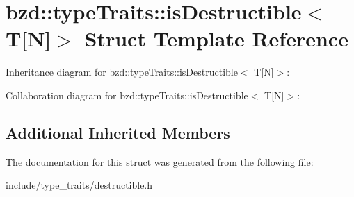 \hypertarget{structbzd_1_1typeTraits_1_1isDestructible_3_01T[N]_4}{}\section{bzd\+:\+:type\+Traits\+:\+:is\+Destructible$<$ T\mbox{[}N\mbox{]}$>$ Struct Template Reference}
\label{structbzd_1_1typeTraits_1_1isDestructible_3_01T[N]_4}


Inheritance diagram for bzd\+:\+:type\+Traits\+:\+:is\+Destructible$<$ T\mbox{[}N\mbox{]}$>$\+:


Collaboration diagram for bzd\+:\+:type\+Traits\+:\+:is\+Destructible$<$ T\mbox{[}N\mbox{]}$>$\+:
\subsection*{Additional Inherited Members}


The documentation for this struct was generated from the following file\+:\begin{DoxyCompactItemize}
\item 
include/type\+\_\+traits/destructible.\+h\end{DoxyCompactItemize}
